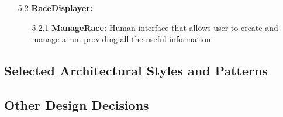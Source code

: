\begin{enumerate}
\item[5.2] \textbf{RaceDisplayer: }
	\begin{enumerate}
		\item[5.2.1] \textbf{ManageRace: } Human interface that allows user to create and manage a run providing all the useful information.
	\end{enumerate}		

\end{enumerate}




\subsection{Selected Architectural Styles and Patterns}
\subsection{Other Design Decisions}